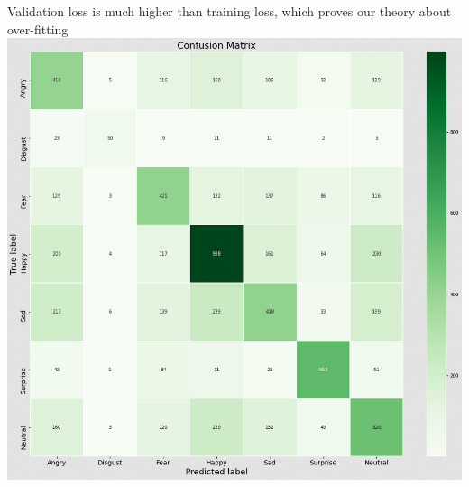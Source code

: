 Validation loss is much higher than training loss, which proves our theory about over-fitting
\includegraphics[scale=0.60]{images/modelOne/matrixOne.png}